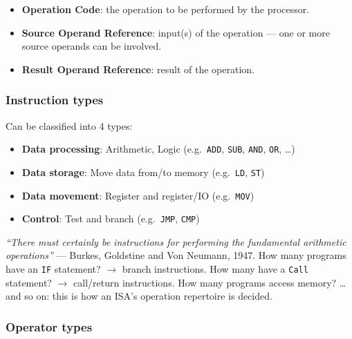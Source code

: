 \begin{definition}
\leavevmode
\begin{itemize}
  \item \textbf{Operation Code}: the operation to be performed by the
  processor.
  \item \textbf{Source Operand Reference}: input(s) of the operation --- one
  or more source operands can be involved.
  \item \textbf{Result Operand Reference}: result of the operation.
\end{itemize}
\end{definition}

\subsubsection{Instruction types}

Can be classified into 4 types:
\begin{itemize}
  \item \textbf{Data processing}: Arithmetic, Logic \quad (e.g.\ \texttt{ADD},
  \texttt{SUB}, \texttt{AND}, \texttt{OR}, \dots)
  \item \textbf{Data storage}: Move data from/to memory \quad (e.g.\
  \texttt{LD}, \texttt{ST})
  \item \textbf{Data movement}: Register and register/IO \quad (e.g.\
  \texttt{MOV})
  \item \textbf{Control}: Test and branch \quad (e.g.\ \texttt{JMP},
  \texttt{CMP})
\end{itemize}

\begin{explanation}
\emph{``There must certainly be instructions for performing the fundamental
arithmetic operations''} --- Burkes, Goldstine and Von Neumann, 1947.
How many programs have an \texttt{IF} statement? $\to$ branch instructions.
How many have a \texttt{Call} statement? $\to$ call/return instructions. How
many programs access memory? \dots and so on: this is how an ISA's operation
repertoire is decided.
\end{explanation}

\subsubsection{Operator types}

